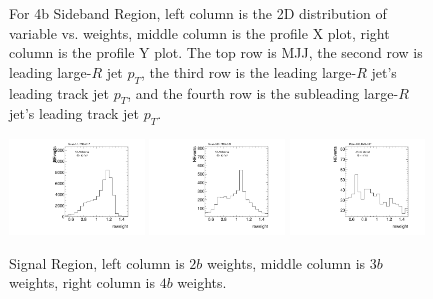 \begin{figure}[htbp!]
\begin{center}
\caption{For 4b Sideband Region, left column is the 2D distribution of variable vs. weights, middle column is the profile X plot, right column is the profile Y plot. The top row is MJJ, the second row is leading large-$R$ jet $p_{T}$, the third row is the leading large-$R$ jet's leading track jet $p_{T}$, and the fourth row is the subleading large-$R$ jet's leading track jet $p_{T}$.}
\label{fig:app-reweight-dist-4b-SB}
\end{center}
\end{figure}


\begin{figure}[htbp!]
\begin{center}
\includegraphics[width=0.32\textwidth,angle=-90]{figures/boosted/AppendixReweight/Weights/2Trk_split_Signal_leadHCand_Pt_m_weight_projy.pdf}
\includegraphics[width=0.32\textwidth,angle=-90]{figures/boosted/AppendixReweight/Weights/3Trk_Signal_leadHCand_Pt_m_weight_projy.pdf}
\includegraphics[width=0.32\textwidth,angle=-90]{figures/boosted/AppendixReweight/Weights/4Trk_Signal_leadHCand_Pt_m_weight_projy.pdf}\\
\caption{Signal Region, left column is $2b$ weights, middle column is $3b$ weights, right column is $4b$ weights.}
\label{fig:app-reweight-dist-weights-SR}
\end{center}
\end{figure}

